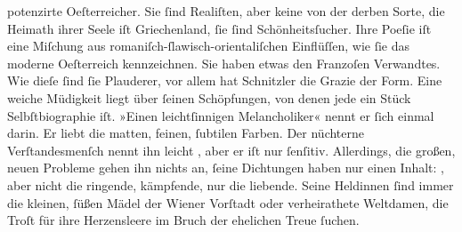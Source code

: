 {{                  potenzirte Oeſterreicher. Sie ſind
                  Realiſten, aber keine von der derben Sorte, die Heimath ihrer Seele iſt Griechenland, ſie ſind Schönheitsſucher. Ihre
                  Poeſie iſt eine Miſchung aus romaniſch-ſlawisch-orientaliſchen Einflüſſen, wie ſie
                  das moderne Oeſterreich kennzeichnen. Sie
                  haben etwas den Franzoſen
                  Verwandtes. Wie dieſe ſind ſie Plauderer, vor allem hat Schnitzler die Grazie der
                  Form. Eine weiche Müdigkeit liegt über ſeinen Schöpfungen, von denen jede ein
                  Stück Selbſtbiographie iſt. »Einen leichtſinnigen Melancholiker« nennt er ſich einmal darin. Er liebt
                  die matten, feinen, ſubtilen Farben. Der nüchterne Verſtandesmenſch nennt ihn
                  leicht , aber er iſt nur ſenſitiv. Allerdings,
                  die großen, neuen Probleme gehen ihn nichts an, ſeine Dichtungen haben nur einen
                  Inhalt: , aber nicht die ringende, kämpfende,
                  nur die liebende. Seine Heldinnen ſind immer die kleinen, ſüßen Mädel der Wiener Vorſtadt oder verheirathete Weltdamen,
                  die Troſt für ihre Herzensleere im Bruch der ehelichen Treue ſuchen.}}\pend
           
